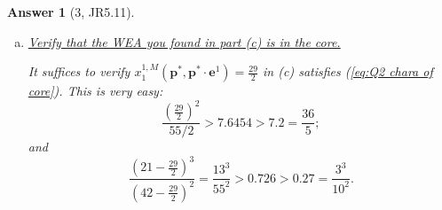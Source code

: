 \documentclass{article}
\newtheorem*{ans}{Answer}
\newcommand{\1}{{\bf 1}}
\newcommand{\0}{{\mathbf{0}}}
\newcommand{\e}{{\mathbf{e}}}
\newcommand{\p}{{\mathbf{p}}}
\newcommand{\x}{{\mathbf{x}}}
\newcommand{\<}{\langle}
\renewcommand{\>}{\rangle}
\begin{document}
\begin{ans}[3, JR5.11]
\begin{enumerate}[(a)]
		
As for UMPs
$$
\max_{\p \cdot \x  \le 18 p_1  +4p_2 } (x_1 x_2 )^2 , \max_{\p \cdot \x  \le 3 p_1  +6p_2}  \ln \left( x_1 x_2^2 	 \right),
$$
Marshallian demand functions are
\begin{eqnarray*}
	x_1^{1,M} \left(\p, \p \cdot  \e^1 \right) = 9 + \frac{2p_2}{p_1 } & ,  & x_2^{1,M} \left(\p, \p \cdot  \e^1 \right) = 2 + \frac{9p_1}{p_2}; \\	
		x_1^{2,M} \left(\p, \p \cdot  \e^2 \right) = 1 + \frac{2p_2}{p_1 } & ,  & x_2^{2,M} \left(\p, \p \cdot  \e^2 \right) = 4 + \frac{2p_1}{p_2}.
	\end{eqnarray*}
		According to definition 5.5, 
\begin{eqnarray*}10 + \frac{4p_2^* }{p_1^* } =  	x_1^{1,M} \left(\p^* , \p^* \cdot  \e^1 \right) + 	x_1^{2,M} \left(\p^*, \p^* \cdot  \e^2 \right) = e_1^1 +e_1^2 = 21, \\
	6 + \frac{11p_1^*}{p_2^*} = x_2^{1,M} \left(\p^* , \p^* \cdot  \e^1 \right) + 	x_2^{2,M} \left(\p^*, \p^* \cdot  \e^2 \right) = e_2^1 + e_2^2 = 10,
\end{eqnarray*}
Hence  $\frac{p_1^*}{p_2^*} = \frac4{11}$ and corresponding WEA is 
\begin{eqnarray*}
	x_1^{1,M} \left(\p^*, \p^* \cdot  \e^1 \right) = \frac{29}{2} & ,  & x_2^{1,M} \left(\p^*, \p^* \cdot  \e^1 \right) = \frac{58}{11}; \\	
		x_1^{2,M} \left(\p^* , \p^* \cdot  \e^2 \right) = \frac{13}2 & ,  & x_2^{2,M} \left(\p^* , \p^* \cdot  \e^2 \right) =  \frac{52}{11 }.
\end{eqnarray*}
		\item \ul{Verify that the WEA you found in part (c) is in the core.}
		
		It suffices to verify $	x_1^{1,M} \left(\p^*, \p^* \cdot  \e^1 \right) = \frac{29}{2}$ in (c) satisfies (\ref{eq:Q2 chara of core}). This is very easy:
		$$\frac{\left(\frac{29}2\right)^2}{55/2} > 7.6454 > 7.2 = \frac{36}5 ;$$
		and 
		$$
		\frac{\left(21 -  \frac{29}2 \right)^3}{ \left(42 -  \frac{29}2 \right)^2} = \frac{13^3}{55 ^2} > 0.726 > 0.27 = \frac{3^3}{10^2}.
		$$
	\end{enumerate}
\end{ans}
\end{document}
